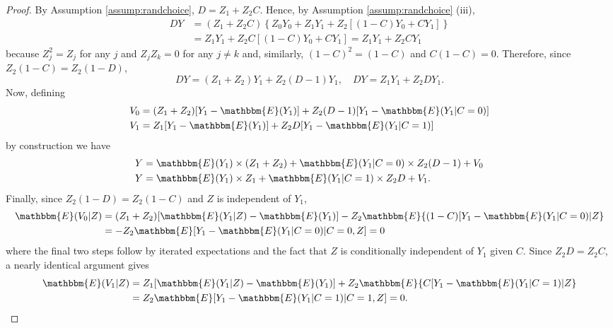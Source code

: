 \begin{proof}
By Assumption \ref{assump:randchoice}, $D = Z_1 + Z_2 C$. Hence, by Assumption \ref{assump:randchoice} (iii),
\begin{align*}
DY &=  (Z_1 + Z_2 C)\left\{Z_0 Y_0 + Z_1 Y_1 + Z_2[(1 - C) Y_0 + CY_1]\right\}\\
&= Z_1 Y_1 + Z_2 C[(1 -C) Y_0 + C Y_1] = Z_1 Y_1 + Z_2 C Y_1
\end{align*}
because $Z_j^2 = Z_j$ for any $j$ and $Z_j Z_k = 0$ for any $j \neq k$ and, similarly, $(1 - C)^2 = (1 - C)$ and $C (1 - C) = 0$. Therefore, since $Z_2 (1 - C) = Z_2 (1 - D)$,
\[
 DY = (Z_1 + Z_2)Y_1 + Z_2 (D - 1) Y_1, \quad
 DY = Z_1 Y_1 + Z_2 D Y_1.
\]
Now, defining
\begin{align*}
V_0 &= (Z_1 + Z_2)[Y_1 - \mathbbm{E}(Y_1)] + Z_2(D - 1)[Y_1 - \mathbbm{E}(Y_1|C=0)]\\
V_1 &= Z_1[Y_1 - \mathbbm{E}(Y_1)] + Z_2D[Y_1 - \mathbbm{E}(Y_1|C=1)]
\end{align*}
by construction we have
\begin{align*}
Y &= \mathbbm{E}(Y_1) \times (Z_1 + Z_2) + \mathbbm{E}(Y_1 | C = 0) \times Z_2 (D - 1) + V_0\\
Y &= \mathbbm{E}(Y_1) \times Z_1 + \mathbbm{E}(Y_1 | C = 1) \times Z_2 D + V _1.
\end{align*}
Finally, since $Z_2(1 - D) = Z_2(1 - C)$ and $Z$ is independent of $Y_1$,
\begin{align*}
\mathbbm{E}(V_0|Z) &= (Z_1 + Z_2) [\mathbbm{E}(Y_1|Z) - \mathbbm{E}(Y_1) ]  - Z_2 \mathbbm{E}\{(1 - C)  [Y_1 - \mathbbm{E}(Y_1 | C=0)|Z\} \\
&= -Z_2 \mathbbm{E}[Y_1 - \mathbbm{E}(Y_1 | C=0)|C=0, Z] = 0
\end{align*}
where the final two steps follow by iterated expectations and the fact that  $Z$ is conditionally independent of $Y_1$ given $C$. 
Since $Z_2 D = Z_2 C$, a nearly identical argument gives
\begin{align*}
\mathbbm{E}(V_1|Z) &= Z_1 [\mathbbm{E}(Y_1 | Z) - \mathbbm{E}(Y_1)]  + Z_2 \mathbbm{E}\{C  [Y_1 - \mathbbm{E}(Y_1 | C=1)|Z\} \\
&= Z_2 \mathbbm{E}[Y_1 - \mathbbm{E}(Y_1 | C=1)|C=1, Z] = 0. \qedhere
\end{align*}
\end{proof}





